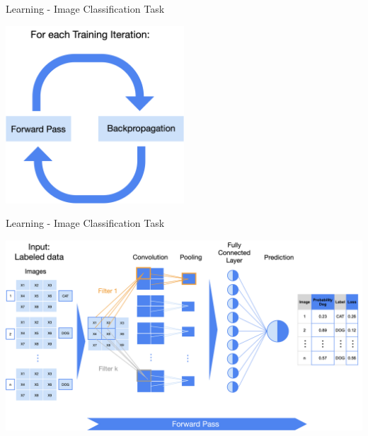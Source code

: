 \documentclass[11pt,compress,t,notes=noshow, xcolor=table]{beamer}
\begin{document}
\begin{vbframe}{Learning - Image Classification Task}
\vspace{0.5cm}
\begin{center}
    \includegraphics[width = 0.5\textwidth]{slides/neural-networks/figure_man/nutshell-nn-learning-iteration.png}   
\end{center}

\end{vbframe}

\begin{vbframe}{Learning - Image Classification Task}
\vspace{0.5cm}
\begin{center}
   \includegraphics[width = \textwidth]{slides/neural-networks/figure_man/nutshell-nn-learning-forwardpass.png}    
\end{center}
 
\end{vbframe}
\end{document}
